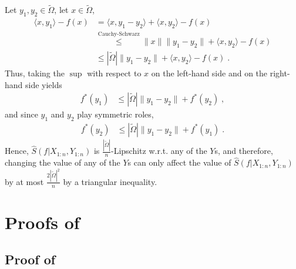 \documentclass{article}
\theoremstyle{plain}
\theoremstyle{definition}
\theoremstyle{remark}
\begin{document}
    
    Let $y_1, y_2 \in \tilde{\Omega}$, let $x \in \tilde{\Omega}$,
    \begin{equation}
        \begin{aligned}
            \langle x, y_1 \rangle - f(x)
            &=
            \langle x, y_1 - y_2 \rangle + \langle x, y_2 \rangle - f(x) \\
            &\stackrel{\text{Cauchy-Schwarz}}{\leq}
            \| x \| \| y_1 - y_2 \| + \langle x, y_2 \rangle - f(x) \\
            &\stackrel{}{\leq}
            |\tilde{\Omega}| \| y_1 - y_2 \| + \langle x, y_2 \rangle - f(x) \;.
        \end{aligned}
    \end{equation}
    Thus, taking the $\sup$ with respect to $x$ on the left-hand side and on the right-hand side yields
    \begin{equation}
        \begin{aligned}
            f^*(y_1)
            &\stackrel{}{\leq}
            |\tilde{\Omega}| \| y_1 - y_2 \| + f^*(y_2) \;,
        \end{aligned}
    \end{equation}
    and since $y_1$ and $y_2$ play symmetric roles, 
    \begin{equation}
        \begin{aligned}
            f^*(y_2)
            &\stackrel{}{\leq}
            |\tilde{\Omega}| \| y_1 - y_2 \| + f^*(y_1) \;.
        \end{aligned}
    \end{equation}
    Hence, $\hat{S}(f | X_{1:n}, Y_{1:n})$ is $\frac{| \tilde{\Omega} |}{n}$-Lipschitz w.r.t. any of the $Y$s, and therefore, changing the value of any of the $Y$s can only affect the value of $\hat{S}(f | X_{1:n}, Y_{1:n})$ by at most $\frac{2 |\tilde{\Omega} |^2}{n}$ by a triangular inequality.



\section{Proofs of }

\subsection{Proof of }
\label{proof_of_from_semidual_to_infty}
\end{document}
